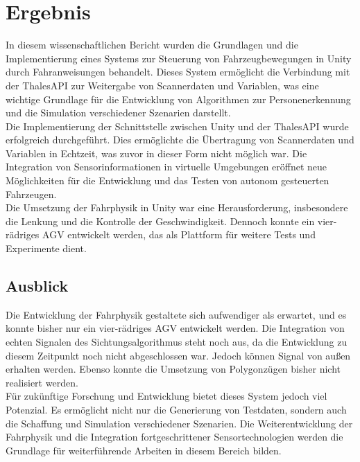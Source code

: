 \chapter{Ergebnis}

In diesem wissenschaftlichen Bericht wurden die Grundlagen und die Implementierung eines Systems zur Steuerung von Fahrzeugbewegungen in Unity durch Fahranweisungen behandelt. Dieses System ermöglicht die Verbindung mit der ThalesAPI zur Weitergabe von Scannerdaten und Variablen, was eine wichtige Grundlage für die Entwicklung von Algorithmen zur Personenerkennung und die Simulation verschiedener Szenarien darstellt.\\


Die Implementierung der Schnittstelle zwischen Unity und der ThalesAPI wurde erfolgreich durchgeführt. Dies ermöglichte die Übertragung von Scannerdaten und Variablen in Echtzeit, was zuvor in dieser Form nicht möglich war. Die Integration von Sensorinformationen in virtuelle Umgebungen eröffnet neue Möglichkeiten für die Entwicklung und das Testen von autonom gesteuerten Fahrzeugen.\\

Die Umsetzung der Fahrphysik in Unity war eine Herausforderung, insbesondere die Lenkung und die Kontrolle der Geschwindigkeit. Dennoch konnte ein vier-rädriges AGV entwickelt werden, das als Plattform für weitere Tests und Experimente dient.\\

\section{Ausblick}

Die Entwicklung der Fahrphysik gestaltete sich aufwendiger als erwartet, und es konnte bisher nur ein vier-rädriges AGV entwickelt werden. Die Integration von echten Signalen des Sichtungsalgorithmus steht noch aus, da die Entwicklung zu diesem Zeitpunkt noch nicht abgeschlossen war. Jedoch können Signal von außen erhalten werden. Ebenso konnte die Umsetzung von Polygonzügen bisher nicht realisiert werden.\\

Für zukünftige Forschung und Entwicklung bietet dieses System jedoch viel Potenzial. Es ermöglicht nicht nur die Generierung von Testdaten, sondern auch die Schaffung und Simulation verschiedener Szenarien. Die Weiterentwicklung der Fahrphysik und die Integration fortgeschrittener Sensortechnologien werden die Grundlage für weiterführende Arbeiten in diesem Bereich bilden.\\

